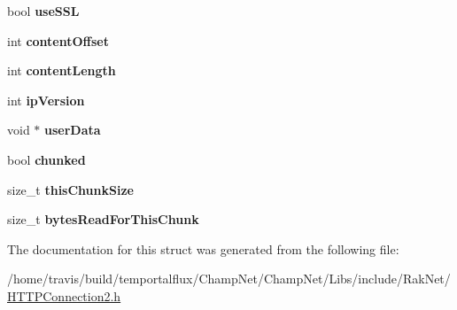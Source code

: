 \begin{DoxyCompactItemize}
\item 
\hypertarget{struct_rak_net_1_1_h_t_t_p_connection2_1_1_request_ab7280ea925d53ae9f5502780643e286a}{bool {\bfseries use\-S\-S\-L}}\label{struct_rak_net_1_1_h_t_t_p_connection2_1_1_request_ab7280ea925d53ae9f5502780643e286a}

\item 
\hypertarget{struct_rak_net_1_1_h_t_t_p_connection2_1_1_request_a0dcb3689fc8635622a7d1f1b58fb3095}{int {\bfseries content\-Offset}}\label{struct_rak_net_1_1_h_t_t_p_connection2_1_1_request_a0dcb3689fc8635622a7d1f1b58fb3095}

\item 
\hypertarget{struct_rak_net_1_1_h_t_t_p_connection2_1_1_request_afdefe0494a030b039ed3fff55f212701}{int {\bfseries content\-Length}}\label{struct_rak_net_1_1_h_t_t_p_connection2_1_1_request_afdefe0494a030b039ed3fff55f212701}

\item 
\hypertarget{struct_rak_net_1_1_h_t_t_p_connection2_1_1_request_a304d56e8dbbc0465c6edbceed6a58204}{int {\bfseries ip\-Version}}\label{struct_rak_net_1_1_h_t_t_p_connection2_1_1_request_a304d56e8dbbc0465c6edbceed6a58204}

\item 
\hypertarget{struct_rak_net_1_1_h_t_t_p_connection2_1_1_request_a253717c2f0e8227fe399ae399d7bb11f}{void $\ast$ {\bfseries user\-Data}}\label{struct_rak_net_1_1_h_t_t_p_connection2_1_1_request_a253717c2f0e8227fe399ae399d7bb11f}

\item 
\hypertarget{struct_rak_net_1_1_h_t_t_p_connection2_1_1_request_a62b74f8686fbeaa229c8473ef754398d}{bool {\bfseries chunked}}\label{struct_rak_net_1_1_h_t_t_p_connection2_1_1_request_a62b74f8686fbeaa229c8473ef754398d}

\item 
\hypertarget{struct_rak_net_1_1_h_t_t_p_connection2_1_1_request_acc4aa9d2546dc48ef8ba5473e9772c19}{size\-\_\-t {\bfseries this\-Chunk\-Size}}\label{struct_rak_net_1_1_h_t_t_p_connection2_1_1_request_acc4aa9d2546dc48ef8ba5473e9772c19}

\item 
\hypertarget{struct_rak_net_1_1_h_t_t_p_connection2_1_1_request_af06023633e0db4a58114ed9993f0af96}{size\-\_\-t {\bfseries bytes\-Read\-For\-This\-Chunk}}\label{struct_rak_net_1_1_h_t_t_p_connection2_1_1_request_af06023633e0db4a58114ed9993f0af96}

\end{DoxyCompactItemize}


The documentation for this struct was generated from the following file\-:\begin{DoxyCompactItemize}
\item 
/home/travis/build/temportalflux/\-Champ\-Net/\-Champ\-Net/\-Libs/include/\-Rak\-Net/\hyperlink{_h_t_t_p_connection2_8h}{H\-T\-T\-P\-Connection2.\-h}\end{DoxyCompactItemize}
